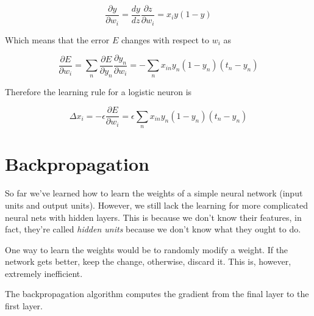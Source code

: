 \documentclass{article}
\begin{document}
\[
    \frac{\partial y}{\partial w_i}=\frac{dy}{dz}\frac{\partial z}{\partial w_i}=x_i y(1-y)
\]

Which means that the error \(E\) changes with respect to \(w_i\) as

\[
    \frac{\partial E}{\partial w_i} =
    \sum_n \frac{\partial E}{\partial y_n} \frac{\partial y_n}{\partial w_i} =
    -\sum_n x_{in} y_n (1-y_n)(t_n-y_n)
\]

Therefore the learning rule for a logistic neuron is

\[
    \Delta x_i = -\epsilon \frac{\partial E}{\partial w_i}=\epsilon \sum_n x_{in} y_n (1-y_n)(t_n-y_n)
\]


\pagebreak

\section{Backpropagation}

So far we've learned how to learn the weights of a simple neural network (input units and output units).
However, we still lack the learning for more complicated neural nets with hidden layers.
This is because we don't know their features, in fact, they're called \textit{hidden units}
because we don't know what they ought to do.

One way to learn the weights would be to randomly modify a weight. If the network
gets better, keep the change, otherwise, discard it. This is, however, extremely
inefficient.

The backpropagation algorithm computes the gradient from the final layer to the first layer.

\end{document}
